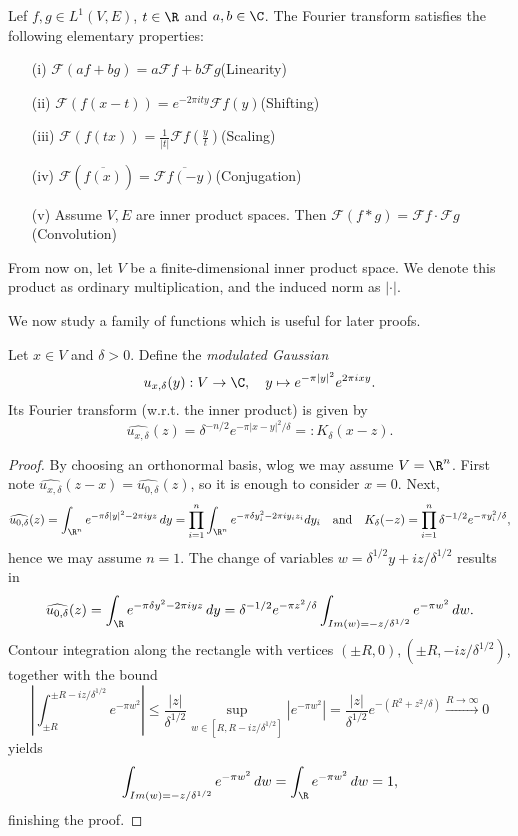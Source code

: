 \begin{lemma}
  \label{lem:fourier-prop}
  \lean{}
Lef $f,g\in L^1(V,E)$, $t\in\R$ and $a,b\in\C$. The Fourier transform satisfies the following elementary properties:
\begin{enumerate}
  \item[(i)] $\mathcal F(af+bg)=a\mathcal Ff+b\mathcal Fg$\hfill(Linearity)
  \item[(ii)] $\mathcal F(f(x-t)) = e^{-2\pi i ty}\mathcal F f(y)$\hfill (Shifting)
  \item[(iii)] $\mathcal F(f(tx)) = \frac1{|t|}\mathcal F f(\frac yt)$\hfill (Scaling)
  \item[(iv)] $\mathcal F(\overline{f(x)}) = \overline{\mathcal Ff(-y)}$\hfill (Conjugation)
  \item[(v)] Assume $V,E$ are inner product spaces. Then $\mathcal F(f\ast g) =\mathcal Ff\cdot\mathcal Fg$ \hfill (Convolution)
\end{enumerate}
\end{lemma}
From now on, let $V$ be a finite-dimensional inner product space.
We denote this product as ordinary multiplication, and the induced norm as $|\cdot|.$

We now study a family of functions which is useful for later proofs.
\begin{lemma}
\label{lem:fourier-gaussian}
\leanok
Let $x\in V$ and $\delta>0$. Define the \emph{modulated Gaussian}
$$u_{x,\delta}(y):V\to\C,\quad y\mapsto e^{-\pi|y|^2}e^{2\pi i x y}.$$
Its Fourier transform (w.r.t. the inner product) is given by
$$\widehat{u_{x,\delta}}(z)=\delta^{-n/2}e^{-\pi|x-y|^2/\delta}=:K_\delta(x-z).$$
\end{lemma}
\begin{proof}
  \leanok
  By choosing an orthonormal basis, wlog we may assume $V=\R^n$.
  First note $\widehat{u_{x,\delta}}(z-x)=\widehat{u_{0,\delta}}(z)$, so it is enough to consider $x=0$.
  Next, $$\widehat{u_{0,\delta}}(z)=\int_{\R^n}e^{-\pi\delta|y|^2-2\pi iyz}\,dy=
  \prod_{i=1}^n\int_{\R^n}e^{-\pi\delta y_i^2-2\pi iy_iz_i}dy_i\quad\text{and}\quad
  K_\delta(-z)=\prod_{i=1}^n\delta^{-1/2}e^{-\pi y_i^2/\delta},$$ hence we may assume $n=1$.
  The change of variables $w=\delta^{1/2}y+iz/\delta^{1/2}$ results in
  $$\widehat{u_{0,\delta}}(z)=\int_{\R} e^{-\pi\delta y^2-2\pi i y z}\,dy=
  \delta^{-1/2}e^{-\pi z^2/\delta}\int_{Im(w)=-z/\delta^{1/2}}e^{-\pi w^2}\,dw.$$
  Contour integration along the rectangle with vertices $(\pm R,0),(\pm R,-iz/\delta^{1/2})$, together
  with the bound $$\left|\int_{\pm R}^{\pm R-iz/\delta^{1/2}}e^{-\pi w^2}\right|\leq
  \frac{|z|}{\delta^{1/2}}\sup_{w\in[R,R-iz/\delta^{1/2}]}|e^{-\pi w^2}|=
  \frac{|z|}{\delta^{1/2}}e^{-(R^2+z^2/\delta)}\xrightarrow{R\to\infty}0$$
  yields
  $$\int_{Im(w)=-z/\delta^{1/2}}e^{-\pi w^2}\,dw=
  \int_{\R} e^{-\pi w^2}\,dw=1,$$ finishing the proof.
\end{proof}

